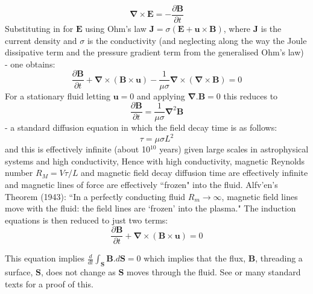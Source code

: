 \begin{equation}
\boldsymbol{\nabla}
\times
\mathbf{E}
=
-
\frac{\partial \mathbf{B} }{\partial t} 
\end{equation}
Substituting in for $\mathbf{E}$ using Ohm's law $ \mathbf{J}=\sigma (\mathbf{E} + \mathbf{u}\times\mathbf{ B}) $, where 
$\mathbf{J}$ is the current density and
$\sigma$ is the conductivity
 (and neglecting along the way the Joule dissipative term and the pressure gradient term from the generalised Ohm's law) - one obtains:
\begin{equation}
\frac{\partial \mathbf{B} }{\partial t} 
+ 
\boldsymbol{\nabla}
\times
\left(
\mathbf{B}
\times
\mathbf{u}
\right)
-
\frac{1}{\mu \sigma}
\boldsymbol{\nabla}
\times
\left(
\boldsymbol{\nabla}
\times
\mathbf{B}
\right)
=
0
\end{equation}
For a stationary fluid letting $\mathbf{u}=0$ and applying $\boldsymbol{\nabla} .\mathbf{B} =0$ this reduces to
\begin{equation}
\frac{\partial \mathbf{B} }{\partial t} 
=
\frac{1}{\mu \sigma}
{\boldsymbol{\nabla}}^2 \mathbf{B}
\end{equation}
- a standard diffusion equation in which the field decay time is as follows:
\begin{equation}
\tau =  \mu \sigma L^2
\end{equation}
and this is effectively infinite (about 10$^{10}$ years) given large scales in astrophysical systems and high conductivity, 
Hence with high conductivity, magnetic Reynolds number $R_M =V \tau / L$
and magnetic field decay diffusion time are effectively infinite and magnetic lines of force are effectively ``frozen" into the fluid.
Alfv\a'en's Theorem (1943): ``In a perfectly conducting fluid $ R_m \rightarrow \infty $, magnetic field lines move with the fluid: the field lines are `frozen' into the plasma." 
The induction equations is then reduced to just two terms:
\begin{equation}
\frac{\partial \mathbf{B} }{\partial t} 
+ 
\boldsymbol{\nabla}
\times
\left(
\mathbf{B}
\times
\mathbf{u}
\right)
=0
\end{equation}

This equation implies $ \frac{d}{dt} \int_\mathbf{S} \mathbf{B}.d\mathbf{S} =0 $
which implies that the flux, $\mathbf{B}$,
threading a surface, $\mathbf{S}$, does not change as $\mathbf{S}$  moves through the
fluid. See  \citet{1998pfp..book.....C} or many standard texts for a proof of this.

